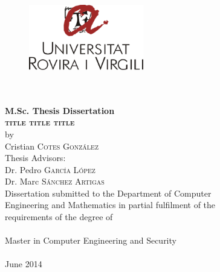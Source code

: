 \begin{titlepage}
\begin{center}
\begin{figure}
	\begin{center}
		\includegraphics[width=5cm]{figures/urv-logo.png}
	\end{center}
\end{figure}
\vspace*{0.3cm}
 \\
\vspace*{0.1cm}
 \\
\vspace*{0.6cm}
\noindent \Huge \textbf{M.Sc. Thesis Dissertation} \\
\vspace*{0.6cm}
\vspace*{0.3cm}
\noindent \Large \textbf{\textsc{title title title}}\\
\vspace*{0.4cm}
\noindent \large {by\\}
\noindent \LARGE Cristian \textsc{Cotes Gonz{\'a}lez} \\
\vspace*{1.3cm}
\noindent \Large {Thesis Advisors:} \\
\noindent \Large Dr. Pedro \textsc{Garc{\'i}a L{\'o}pez}\\
\noindent \Large Dr. Marc \textsc{S{\'a}nchez Artigas}\\
\vspace*{2.0cm}
\noindent \large Dissertation submitted to the Department of Computer \\
\noindent \large Engineering and Mathematics in partial fulfilment of the  \\
\noindent \large requirements of the degree of \\[0.5cm]
\noindent \large \\ Master in Computer Engineering and Security
\\[1cm]
\noindent \large \\ June 2014
\vspace*{0.5cm}

\end{center}





\end{titlepage}
\sloppy

\titlepage
